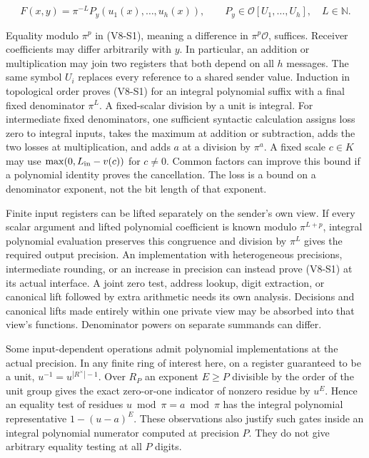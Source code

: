 \documentclass[
  11pt,
]{article}
\begin{document}
\[
 F(x,y)=\pi^{-L}P_y(u_1(x),\ldots,u_h(x)),\qquad
 P_y\in\mathcal O[U_1,\ldots,U_h],\quad L\in\mathbb N.                 \tag{V8-S1}
\]

Equality modulo \(\pi^p\) in (V8-S1), meaning a difference in
\(\pi^p\mathcal O\), suffices. Receiver coefficients may differ
arbitrarily with \(y\). In particular, an addition or multiplication may
join two registers that both depend on all \(h\) messages. The same
symbol \(U_i\) replaces every reference to a shared sender value.
Induction in topological order proves (V8-S1) for an integral polynomial
suffix with a final fixed denominator \(\pi^L\). A fixed-scalar division
by a unit is integral. For intermediate fixed denominators, one
sufficient syntactic calculation assigns loss zero to integral inputs,
takes the maximum at addition or subtraction, adds the two losses at
multiplication, and adds \(a\) at a division by \(\pi^a\). A fixed scale
\(c\in K\) may use \(\max(0,L_{\rm in}-v(c))\) for \(c\ne0\). Common
factors can improve this bound if a polynomial identity proves the
cancellation. The loss is a bound on a denominator exponent, not the bit
length of that exponent.

Finite input registers can be lifted separately on the sender's own
view. If every scalar argument and lifted polynomial coefficient is
known modulo \(\pi^{L+p}\), integral polynomial evaluation preserves
this congruence and division by \(\pi^L\) gives the required output
precision. An implementation with heterogeneous precisions, intermediate
rounding, or an increase in precision can instead prove (V8-S1) at its
actual interface. A joint zero test, address lookup, digit extraction,
or canonical lift followed by extra arithmetic needs its own analysis.
Decisions and canonical lifts made entirely within one private view may
be absorbed into that view's functions. Denominator powers on separate
summands can differ.

Some input-dependent operations admit polynomial implementations at the
actual precision. In any finite ring of interest here, on a register
guaranteed to be a unit, \(u^{-1}=u^{|R^\times|-1}\). Over \(R_P\) an
exponent \(E\ge P\) divisible by the order of the unit group gives the
exact zero-or-one indicator of nonzero residue by \(u^E\). Hence an
equality test of residues \(u\bmod\pi=a\bmod\pi\) has the integral
polynomial representative \(1-(u-a)^E\). These observations also justify
such gates inside an integral polynomial numerator computed at precision
\(P\). They do not give arbitrary equality testing at all \(P\) digits.
\end{document}
